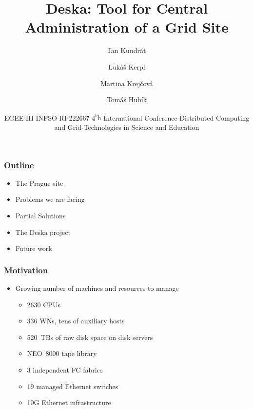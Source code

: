 \documentclass{beamer}
\begin{document}
\title{Deska: Tool for Central Administration of a Grid Site}
\author{Jan Kundrát \and Lukáš Kerpl \and Martina Krejčová \and Tomáš Hubík}
\date{
   {EGEE-III INFSO-RI-222667}  
   4{\textsuperscript th} International Conference Distributed Computing and Grid-Technologies in
Science and Education
}
\begin{frame}
\maketitle
\end{frame}

\begin{frame}[fragile]
\frametitle{Outline}
\begin{itemize}
    \item The Prague site
    \item Problems we are facing
    \item Partial Solutions
    \item The Deska project
    \item Future work
\end{itemize}
\end{frame}

\begin{frame}[fragile]
\frametitle{Motivation}
\begin{itemize}
    \item Growing number of machines and resources to manage
        \begin{itemize}
            \item 2630 CPUs
            \item 336 WNs, tens of auxiliary hosts
            \item 520~TBs of raw disk space on disk servers
            \item NEO~8000 tape library
            \item 3 independent FC fabrics
            \item 19 managed Ethernet switches
            \item 10G Ethernet infrastructure
        \end{itemize}
\end{itemize}
\end{frame}
\end{document}
